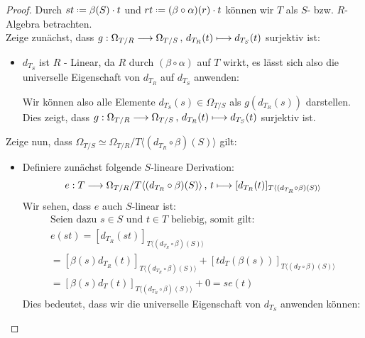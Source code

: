 \documentclass[10pt,a4paper]{report}
\newcommand{\function}[5]{\nolinebreak{#1:#2 \longrightarrow #3 \, , \, #4 \longmapsto #5}}
\newcommand{\divR}[2]{\Omega_{#1/#2}}
\newcommand{\divf}[1]{d_{#1}}
\newcommand*{\defeq}{\mathrel{\vcenter{\baselineskip0.5ex \lineskiplimit0pt
                     \hbox{\scriptsize.}\hbox{\scriptsize.}}}%
                     =}
\begin{document}
\begin{proof}
Durch $st \defeq \beta (S) \cdot t$ und $rt \defeq (\beta \circ \alpha) (r) \cdot t$ können wir $T$ als $S$- bzw. $R$-Algebra betrachten.\\
Zeige zunächst, dass $\function{g}{\divR{T}{R}}{\divR{T}{S}}{\divf{T_R}(t)}{\divf{T_S}(t)}$ surjektiv ist:
\begin{itemize}
\item[]
$\divf{T_S}$ ist $R$ - Linear, da $R$ durch $(\beta \circ \alpha)$ auf $T$ wirkt, es lässt sich also die universelle Eigenschaft von $\divf{T_R}$ auf $\divf{T_S}$ anwenden:
\begin{center}
\end{center}
Wir können also alle Elemente $\divf{T_S}(s) \in \divR{T}{S}$ als $g(\divf{T_R}(s))$ darstellen.
Dies zeigt, dass $\function{g}{\divR{T}{R}}{\divR{T}{S}}{\divf{T_R}(t)}{\divf{T_S}(t)}$ surjektiv ist.
\end{itemize}
Zeige nun, dass $\divR{T}{S} \simeq \divR{T}{R}/T \langle (\divf{T_R} \circ \beta)(S) \rangle$ gilt:
\begin{itemize}
\item[] Definiere zunächst folgende $S$-lineare Derivation:
\begin{gather*}
\function{e}{T}{\divR{T}{R} / T \langle (\divf{T_R} \circ \beta)(S) \rangle }{t}{[\divf{T_R}(t)]_{T \langle (\divf{T_R} \circ \beta)(S) \rangle}}
\end{gather*}
Wir sehen, dass $e$ auch $S$-linear ist:
\begin{gather*}
\text{Seien dazu } s \in S \text{ und } t \in T \text{ beliebig, somit gilt:}\\
e(st) = [\divf{T_R}(st)]_{T \langle (\divf{T_R} \circ \beta)(S) \rangle}\\
=[\beta(s) \divf{T_R}(t)]_{T \langle (\divf{T_R} \circ \beta)(S) \rangle} + [t \divf{T}(\beta(s))]_{T \langle (\divf{T} \circ \beta)(S) \rangle}\\
= [\beta(s) \divf{T}(t)]_{T \langle (\divf{T_R} \circ \beta)(S) \rangle} + 0 = se(t)
\end{gather*}
Dies bedeutet, dass wir die universelle Eigenschaft von $\divf{T_S}$ anwenden können:
\begin{center}

\end{center}
\end{itemize}
\end{proof}
\end{document}
